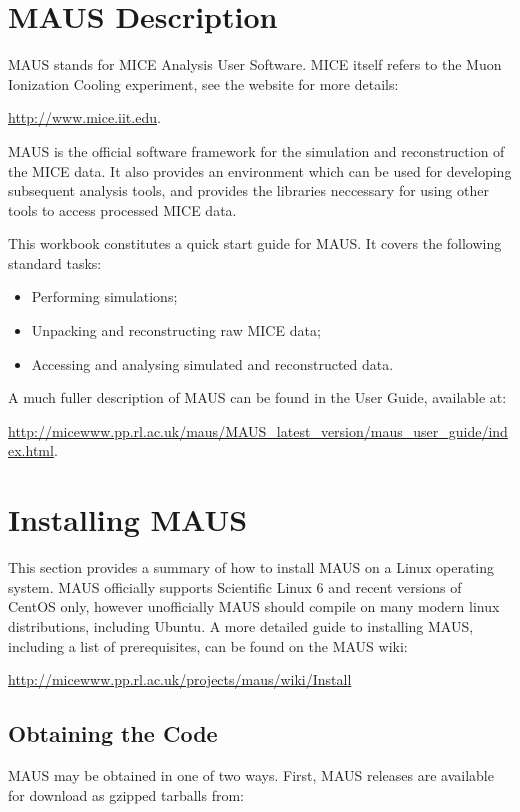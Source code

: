 \documentclass[a4paper,10pt]{article}
\begin{document}
\pagebreak

\section{MAUS Description}
\label{sec:MAUSDescription}
  MAUS stands for MICE Analysis User Software. MICE itself refers to the Muon Ionization Cooling experiment, see the website for more details:

  \medskip
  \url{http://www.mice.iit.edu}. %
  \medskip

  MAUS is the official software framework for the simulation and reconstruction of the MICE data. It also provides an environment which can be used for developing subsequent analysis tools, and provides the libraries neccessary for using other tools to access processed MICE data.
  
  This workbook constitutes a quick start guide for MAUS.  It covers the following standard tasks:
  
  \begin{itemize}
    \item Performing simulations;
    \item Unpacking and reconstructing raw MICE data;
    \item Accessing and analysing simulated and reconstructed data.
  \end{itemize}

  A much fuller description of MAUS can be found in the User Guide, available at:

  \medskip
  \url{http://micewww.pp.rl.ac.uk/maus/MAUS_latest_version/maus_user_guide/index.html}. %

\section{Installing MAUS}
\label{sec:InstallingMAUS}
  This section provides a summary of how to install MAUS on a Linux operating system. MAUS officially supports Scientific Linux 6 and recent versions of CentOS only, however unofficially MAUS should compile on many modern linux distributions, including Ubuntu.  A more detailed guide to installing MAUS, including a list of prerequisites, can be found on the MAUS wiki:

  \url{http://micewww.pp.rl.ac.uk/projects/maus/wiki/Install}

  \subsection{Obtaining the Code}
    MAUS may be obtained in one of two ways. First, MAUS releases are available for download as gzipped tarballs from:
\end{document}
